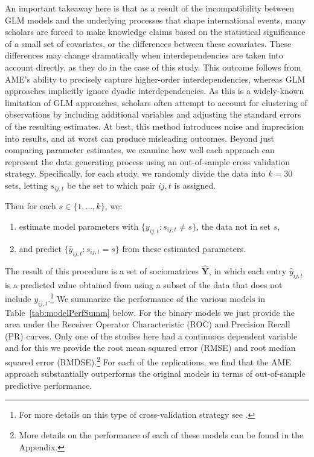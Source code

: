 \documentclass{article}[12pt]
\begin{document}
An important takeaway here is that as a result of the incompatibility
between GLM models and the underlying processes that shape
international events, many scholars are forced to make knowledge claims
based on the statistical significance of a small set of covariates, or
the differences between these covariates.  These differences may
change dramatically when interdependencies are taken into account
directly, as they do in the case of this study. %
This outcome follows from AME's ability to precisely capture higher-order
interdependencies, whereas GLM approaches implicitly ignore dyadic
interdependencies. As this is a widely-known limitation of GLM
approaches, scholars often attempt to account for clustering of
observations by including additional variables and adjusting the
standard errors of the resulting estimates. At best, this method
introduces noise and imprecision into results, and at worst can
produce misleading outcomes.   Beyond just comparing parameter
estimates, we examine how well each approach can represent the data
generating process using an out-of-sample cross validation
strategy. Specifically, for each study, we randomly divide the data
into $k=30$ sets, letting $s_{ij,t}$ be the set to which pair $ij,t$
is assigned.

Then for each $s \in \{1,\ldots,k\}$, we:

\begin{enumerate}
	\item estimate model parameters with $\{y_{ij,t}: s_{ij,t} \neq s\}$, the data not in set $s$,
	\item and predict $\{\hat{y}_{ij,t}: s_{ij,t} = s\}$ from these estimated parameters. 
\end{enumerate}

\noindent The result of this procedure is a set of sociomatrices $\bm \hat Y$, in which each entry $\hat y_{ij,t}$ is a predicted value obtained from using a subset of the data that does not include $y_{ij,t}$.\footnote{For more details on this type of cross-validation strategy see \citet{minhas:etal:2016:arxiv}.} We summarize the performance of the various models in Table~\ref{tab:modelPerfSumm} below. For the binary models we just provide the area under the Receiver Operator Characteristic (ROC) and Precision Recall (PR) curves. Only one of the studies here had a continuous dependent variable and for this we provide the root mean squared error (RMSE) and root median squared error (RMDSE).\footnote{More details on the performance of each of these models can be found in the Appendix.} For each of the replications, we find that the AME approach substantially outperforms the original models in terms of out-of-sample predictive performance.
\end{document}
